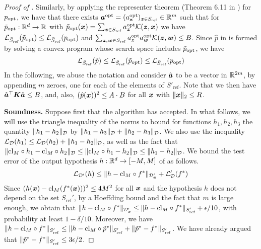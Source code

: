 \documentclass[11pt]{article} %
\numberwithin{equation}{section}
\begin{document}
\begin{proof}[Proof of ]
    Similarly, by applying the representer theorem (Theorem 6.11 in \cite{mohri2018foundations}) for $p_{\mathrm{opt}}$, we have that there exists ${\bm{a}}^{\mathrm{opt}} = (a^{\mathrm{opt}}_{{\bm{z}}})_{{\bm{z}}\in S_{\mathrm{ref}}}\in\mathbb{R}^{m}$ such that for $\tilde{p}_{\mathrm{opt}}:\mathbb{R}^d \to \mathbb{R}$ with $\tilde{p}_{\mathrm{opt}}({\bm{x}}) = \sum_{{\bm{z}}\in S_{\mathrm{ref}}} a^{\mathrm{opt}}_{\bm{z}} \mathcal{K}({\bm{z}},{\bm{x}})$ we have ${\mathcal{L}}_{\bar{S}_{\mathrm{ref}}}(\tilde{p}_{\mathrm{opt}}) \le {\mathcal{L}}_{\bar{S}_{\mathrm{ref}}}(p_{\mathrm{opt}})$ and $\sum_{{\bm{z}},{\bm{w}}\in S_{\mathrm{ref}}} a^{\mathrm{opt}}_{\bm{z}} a^{\mathrm{opt}}_{\bm{w}} \mathcal{K}({\bm{z}},{\bm{w}}) \le B$. Since $\hat p$ in  is formed by solving a convex program whose search space includes $\tilde{p}_{\mathrm{opt}}$, we have
    \begin{equation}\label{equation:phat-optimality}
        {\mathcal{L}}_{\bar{S}_{\mathrm{ref}}}(\hat{p}) \le {\mathcal{L}}_{\bar{S}_{\mathrm{ref}}}(\tilde{p}_{\mathrm{opt}}) \le {\mathcal{L}}_{\bar{S}_{\mathrm{ref}}}(p_{\mathrm{opt}})
    \end{equation}
    In the following, we abuse the notation and consider $\hat{{\bm{a}}}$ to be a vector in $\mathbb{R}^{2m}$, by appending $m$ zeroes, one for each of the elements of $S'_{\mathrm{ref}}$. Note that we then have $\hat{{\bm{a}}}^\top {\bm{K}} \hat{{\bm{a}}} \le B$, and, also, $(\hat p({\bm{x}}))^2 \le A\cdot B$ for all ${\bm{x}}$ with $\|{\bm{x}}\|_2\le R$.

    \noindent\textbf{Soundness.} Suppose first that the algorithm has accepted. In what follows, we will use the triangle inequality of the norms to bound for functions $h_1,h_2,h_3$ the quantity $\|h_1 - h_2\|_{{\mathcal{D}}}$ by $\|h_1-h_3\|_{{\mathcal{D}}}+ \|h_2-h_3\|_{\mathcal{D}}$. We also use the inequality ${\mathcal{L}}_{\mathcal{D}}(h_1) \le {\mathcal{L}}_{\mathcal{D}}(h_2) + \|h_1-h_2\|_{{\mathcal{D}}}$, as well as the fact that $\|\mathrm{cl}_M \circ h_1 - \mathrm{cl}_M\circ h_2\|_{\mathcal{D}} \le \|\mathrm{cl}_M \circ h_1 -  h_2\|_{\mathcal{D}} \le \| h_1 - h_2\|_{\mathcal{D}}$. We bound the test error of the output hypothesis $h:\mathbb{R}^d \to [-M,M]$ of  as follows.
    \begin{align*}
        {\mathcal{L}}_{{\mathcal{D}}'}(h) \le \| h - \mathrm{cl}_M\circ f^* \|_{{\mathcal{D}}_{{\bm{x}}}'} + {\mathcal{L}}_{\mathcal{D}}'(f^*)
    \end{align*}
    Since $(h({\bm{x}}) - \mathrm{cl}_M(f^*({\bm{x}})))^2 \le 4M^2$ for all ${\bm{x}}$ and the hypothesis $h$ does not depend on the set $S_{\mathrm{ref}}'$, by a Hoeffding bound and the fact that $m$ is large enough, we obtain that $\| h - \mathrm{cl}_M\circ f^* \|_{{\mathcal{D}}_{{\bm{x}}}'} \le \| h - \mathrm{cl}_M\circ f^* \|_{S_{\mathrm{ref}}'} + {\epsilon}/10$, with probability at least $1-\delta/10$.
    Moreover, we have $\| h - \mathrm{cl}_M\circ f^* \|_{S_{\mathrm{ref}}'} \le \| h - \mathrm{cl}_M\circ \tilde{p}^* \|_{S_{\mathrm{ref}}'} + \| \tilde{p}^* -  f^* \|_{S_{\mathrm{ref}}'}$. We have already argued that $\| \tilde{p}^* -  f^* \|_{S_{\mathrm{ref}}'} \le 3{\epsilon}/2$.


\end{proof}
\end{document}
